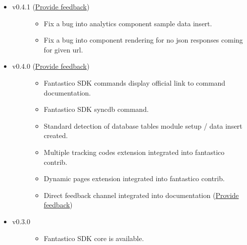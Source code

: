 \documentclass[letterpaper,10pt,english]{sphinxmanual}
\begin{document}
\begin{itemize}
\begin{itemize}
\end{itemize}

\item {} \begin{description}
\item[{v0.4.1 (\href{https://docs.google.com/forms/d/1tKBopU3lfDB\_w8F4h7Rl1Rn4uydAJq-nha09L\_ptJck/edit?usp=sharing}{Provide feedback})}] \leavevmode\begin{itemize}
\item {} 
Fix a bug into analytics component sample data insert.

\item {} 
Fix a bug into component rendering for no json responses coming for given url.

\end{itemize}

\end{description}

\item {} \begin{description}
\item[{v0.4.0 (\href{https://docs.google.com/forms/d/1tKBopU3lfDB\_w8F4h7Rl1Rn4uydAJq-nha09L\_ptJck/edit?usp=sharing}{Provide feedback})}] \leavevmode\begin{itemize}
\item {} 
Fantastico SDK commands display official link to command documentation.

\item {} 
Fantastico SDK syncdb command.

\item {} 
Standard detection of database tables module setup / data insert created.

\item {} 
Multiple tracking codes extension integrated into fantastico contrib.

\item {} 
Dynamic pages extension integrated into fantastico contrib.

\item {} 
Direct feedback channel integrated into documentation (\href{https://docs.google.com/forms/d/1tKBopU3lfDB\_w8F4h7Rl1Rn4uydAJq-nha09L\_ptJck/edit?usp=sharing}{Provide feedback})

\end{itemize}

\end{description}

\item {} \begin{description}
\item[{v0.3.0}] \leavevmode\begin{itemize}
\item {} 
Fantastico SDK core is available.


\end{itemize}
\end{description}
\end{itemize}
\end{document}
